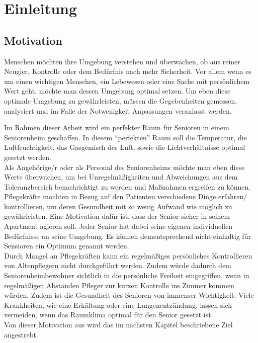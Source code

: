 \chapter{Einleitung}

\section{Motivation}
Menschen möchten ihre Umgebung verstehen und überwachen, ob aus reiner Neugier, Kontrolle oder dem Bedürfnis nach mehr Sicherheit. Vor allem wenn es um einen wichtigen Menschen, ein Lebewesen oder eine Sache mit persönlichem Wert geht, möchte man dessen Umgebung optimal setzen. Um eben diese optimale Umgebung zu gewährleisten, müssen die Gegebenheiten gemessen, analysiert und im Falle der Notwenigkeit Anpassungen veranlasst werden.

Im Rahmen dieser Arbeit wird ein perfekter Raum für Senioren in einem Seniorenheim geschaffen. In diesem ``perfekten'' Raum soll die Temperatur, die Luftfeuchtigkeit, das Gasgemisch der Luft, sowie die Lichtverhältnisse optimal gesetzt werden.\\
Als Angehörige/r oder als Personal des Seniorenheims möchte man eben diese Werte überwachen, um bei Unregelmäßigkeiten und Abweichungen aus dem Toleranzbereich benachrichtigt zu werden und Maßnahmen ergreifen zu können.\\
Pflegekräfte möchten in Bezug auf den Patienten verschiedene Dinge erfahren/ kontrollieren, um deren Gesundheit mit so wenig Aufwand wie möglich zu gewährleisten. Eine Motivation dafür ist, dass der Senior sicher in seinem Apartment agieren soll. Jeder Senior hat dabei seine eigenen individuellen Bedürfnisse an seine Umgebung. Es können dementsprechend nicht einhaltig für Sensioren ein Optimum genannt werden.
\\Durch Mangel an Pflegekräften kann ein regelmäßiges persönliches Kontrollieren von Altenpflegern nicht durchgeführt werden. Zudem würde dadurch dem Seniorenheimbewohner sichtlich in die persönliche Freiheit eingegriffen, wenn in regelmäßigen Abständen Pfleger zur kurzen Kontrolle ins Zimmer kommen würden. Zudem ist die Gesundheit des Senioren von immenser Wichtigkeit. Viele Krankheiten, wie eine Erkältung oder eine Lungenentzündung, lassen sich vermeiden, wenn das Raumklima optimal für den Senior gesetzt ist.\\
Von dieser Motivation aus wird das im nächsten Kapitel beschriebene Ziel angestrebt.
